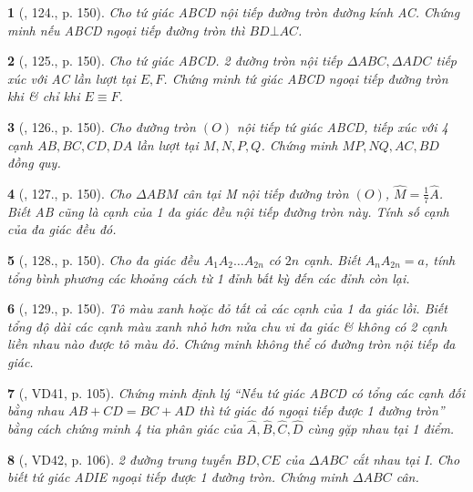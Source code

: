 \documentclass{article}
\newtheorem{baitoan}{}
\begin{document}
\begin{baitoan}[\cite{Tuyen_Toan_9_old}, 124., p. 150]
	Cho tứ giác ABCD nội tiếp đường tròn đường kính AC. Chứng minh nếu ABCD ngoại tiếp đường tròn thì $BD\bot AC$.
\end{baitoan}

\begin{baitoan}[\cite{Tuyen_Toan_9_old}, 125., p. 150]
	Cho tứ giác ABCD. 2 đường tròn nội tiếp $\Delta ABC,\Delta ADC$ tiếp xúc với AC lần lượt tại $E,F$. Chứng minh tứ giác ABCD ngoại tiếp đường tròn khi \& chỉ khi $E\equiv F$.
\end{baitoan}

\begin{baitoan}[\cite{Tuyen_Toan_9_old}, 126., p. 150]
	Cho đường tròn $(O)$ nội tiếp tứ giác ABCD, tiếp xúc với 4 cạnh $AB,BC,CD,DA$ lần lượt tại $M,N,P,Q$. Chứng minh $MP,NQ,AC,BD$ đồng quy.
\end{baitoan}

\begin{baitoan}[\cite{Tuyen_Toan_9_old}, 127., p. 150]
	Cho $\Delta ABM$ cân tại M nội tiếp đường tròn $(O)$, $\widehat{M} = \frac{1}{7}\widehat{A}$. Biết AB cũng là cạnh của 1 đa giác đều nội tiếp đường tròn này. Tính số cạnh của đa giác đều đó.
\end{baitoan}

\begin{baitoan}[\cite{Tuyen_Toan_9_old}, 128., p. 150]
	Cho đa giác đều $A_1A_2\ldots A_{2n}$ có $2n$ cạnh. Biết $A_nA_{2n} = a$, tính tổng bình phương các khoảng cách từ 1 đỉnh bất kỳ đến các đỉnh còn lại.
\end{baitoan}

\begin{baitoan}[\cite{Tuyen_Toan_9_old}, 129., p. 150]
	Tô màu xanh hoặc đỏ tất cả các cạnh của 1 đa giác lồi. Biết tổng độ dài các cạnh màu xanh nhỏ hơn nửa chu vi đa giác \& không có 2 cạnh liền nhau nào được tô màu đỏ. Chứng minh không thể có đường tròn nội tiếp đa giác.
\end{baitoan}

\begin{baitoan}[\cite{Binh_Toan_9_tap_2}, VD41, p. 105]
	Chứng minh định lý ``Nếu tứ giác ABCD có tổng các cạnh đối bằng nhau $AB + CD = BC + AD$ thì tứ giác đó ngoại tiếp được 1 đường tròn'' bằng cách chứng minh 4 tia phân giác của $\widehat{A},\widehat{B},\widehat{C},\widehat{D}$ cùng gặp nhau tại 1 điểm.
\end{baitoan}

\begin{baitoan}[\cite{Binh_Toan_9_tap_2}, VD42, p. 106]
	2 đường trung tuyến $BD,CE$ của $\Delta ABC$ cắt nhau tại I. Cho biết tứ giác ADIE ngoại tiếp được 1 đường tròn. Chứng minh $\Delta ABC$ cân.
\end{baitoan}
\end{document}
